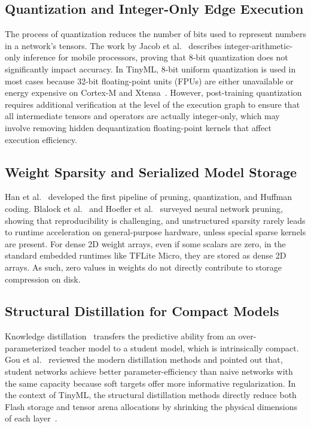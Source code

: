 \documentclass[journal,10pt]{IEEEtran}
\begin{document}
\subsection{Quantization and Integer-Only Edge Execution}
The process of quantization reduces the number of bits used to represent numbers in a network's tensors. The work by Jacob et al.~\cite{jacob2018quantization} describes integer-arithmetic-only inference for mobile processors, proving that 8-bit quantization does not significantly impact accuracy. In TinyML, 8-bit uniform quantization is used in most cases because 32-bit floating-point units (FPUs) are either unavailable or energy expensive on Cortex-M and Xtensa~\cite{banbury2021benchmarking,gholami2022survey}. However, post-training quantization requires additional verification at the level of the execution graph to ensure that all intermediate tensors and operators are actually integer-only, which may involve removing hidden dequantization floating-point kernels that affect execution efficiency.

\subsection{Weight Sparsity and Serialized Model Storage}
Han et al.~\cite{han2016deep} developed the first pipeline of pruning, quantization, and Huffman coding. Blalock et al.~\cite{blalock2020state} and Hoefler et al.~\cite{hoefler2021sparsity} surveyed neural network pruning, showing that reproducibility is challenging, and unstructured sparsity rarely leads to runtime acceleration on general-purpose hardware, unless special sparse kernels are present. For dense 2D weight arrays, even if some scalars are zero, in the standard embedded runtimes like TFLite Micro, they are stored as dense 2D arrays. As such, zero values in weights do not directly contribute to storage compression on disk.

\subsection{Structural Distillation for Compact Models}
Knowledge distillation~\cite{hinton2015distilling} transfers the predictive ability from an over-parameterized teacher model to a student model, which is intrinsically compact. Gou et al.~\cite{gou2021knowledge} reviewed the modern distillation methods and pointed out that, student networks achieve better parameter-efficiency than naive networks with the same capacity because soft targets offer more informative regularization. In the context of TinyML, the structural distillation methods directly reduce both Flash storage and tensor arena allocations by shrinking the physical dimensions of each layer~\cite{polino2018model}.
\end{document}

